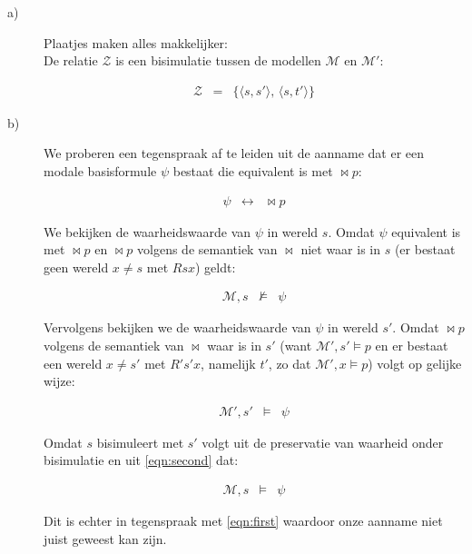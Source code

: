 \documentclass[a4paper,11pt]{article}
\begin{document}
\begin{description}

\item[a)]

Plaatjes maken alles makkelijker:\\[1em]



De relatie $\mathcal{Z}$ is een bisimulatie tussen de modellen $\mathcal{M}$ en
$\mathcal{M'}$:

\begin{eqnarray*}
\mathcal{Z} & = & \{ \langle s, s' \rangle , \, \langle s, t' \rangle \}
\end{eqnarray*}

\item[b)]

We proberen een tegenspraak af te leiden uit de aanname dat er een modale
basisformule $\psi$ bestaat die equivalent is met $\bowtie p$:

\begin{eqnarray*}
\psi & \leftrightarrow & \bowtie p
\end{eqnarray*}

We bekijken de waarheidswaarde van $\psi$ in wereld $s$. Omdat $\psi$
equivalent is met $\bowtie p$ en $\bowtie p$ volgens de semantiek van
$\bowtie$ niet waar is in $s$ (er bestaat geen wereld $x \not= s$ met $Rsx$)
geldt:

\begin{eqnarray}\label{eqn:first}
\mathcal{M},s & \not\models & \psi
\end{eqnarray}

Vervolgens bekijken we de waarheidswaarde van $\psi$ in wereld $s'$. Omdat
$\bowtie p$ volgens de semantiek van $\bowtie$ waar is in $s'$ (want
$\mathcal{M'},s' \models p$ en er bestaat een wereld $x \not= s'$ met $R's'x$,
namelijk $t'$, zo dat $\mathcal{M'},x \models p$) volgt op gelijke wijze:

\begin{eqnarray}\label{eqn:second}
\mathcal{M'},s' & \models & \psi
\end{eqnarray}

Omdat $s$ bisimuleert met $s'$ volgt uit de preservatie van waarheid onder
bisimulatie en uit \ref{eqn:second} dat:

\begin{eqnarray*}
\mathcal{M},s & \models & \psi
\end{eqnarray*}

Dit is echter in tegenspraak met \ref{eqn:first} waardoor onze aanname niet
juist geweest kan zijn.

\end{description}
\end{document}
